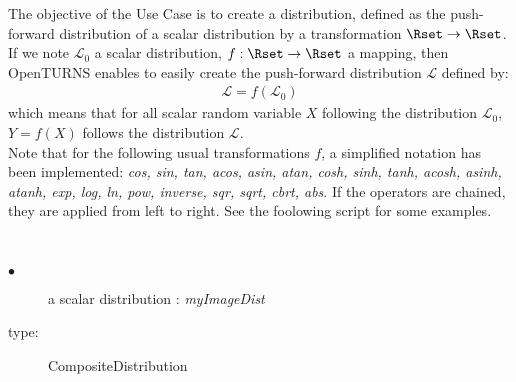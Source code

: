 \renewcommand{\filename}{docUC_InputNoData_CompositeDistribution.tex}
\renewcommand{\filetitle}{UC : Creation  of 1D distribution from a 1D distribution}

\HeaderIIILevel







The objective of the Use Case is to create a distribution, defined as the push-forward distribution of a scalar distribution  by a transformation $\Rset \rightarrow \Rset$. \\

If we note $\mathcal{L}_0$ a scalar distribution, $f: \Rset \rightarrow \Rset$ a mapping, then OpenTURNS enables to easily create the push-forward distribution $\mathcal{L}$ defined by: 
\begin{align}
\mathcal{L} = f(\mathcal{L}_0)
\end{align}
which means that for all scalar random variable $X$ following the distribution $\mathcal{L}_0$, $Y=f(X)$ follows the distribution $\mathcal{L}$. \\

Note that for the following usual transformations $f$, a simplified notation has been implemented: \emph{cos, sin, tan, acos, asin, atan, cosh, sinh, tanh, acosh, asinh, atanh, exp,  log, ln, pow, inverse, sqr, sqrt, cbrt, abs}.  If the operators are chained, they are applied from left to right. See the foolowing script for some examples.


             \textspace\\

\noindent%
             {
  \begin{description}
  \item[$\bullet$] a scalar distribution : {\itshape myImageDist}
  \item[type:] CompositeDistribution
  \end{description}
             }

